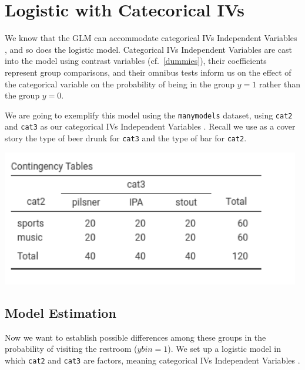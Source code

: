 \documentclass[
]{book}
\begin{document}
\hypertarget{gzlmanova}{%
\section{Logistic with Catecorical IVs}\label{gzlmanova}}

We know that the GLM can accommodate categorical {IVs {Independent Variables} }, and so does the logistic model. Categorical {IVs {Independent Variables} } are cast into the model using contrast variables (cf.~\ref{dummies}), their coefficients represent group comparisons, and their omnibus tests inform us on the effect of the categorical variable on the probability of being in the group \(y=1\) rather than the group \(y=0\).

We are going to exemplify this model using the \texttt{manymodels} dataset, using \texttt{cat2} and \texttt{cat3} as our categorical {IVs {Independent Variables} }. Recall we use as a cover story the type of beer drunk for \texttt{cat3} and the type of bar for \texttt{cat2}.

\includegraphics[width=5.15in]{bookletpics/3_logistic_output6}

\hypertarget{model-estimation}{%
\subsection{Model Estimation}\label{model-estimation}}

Now we want to establish possible differences among these groups in the probability of visiting the restroom (\(ybin=1\)). We set up a logistic model in which \texttt{cat2} and \texttt{cat3} are factors, meaning categorical {IVs {Independent Variables} }.
\end{document}
